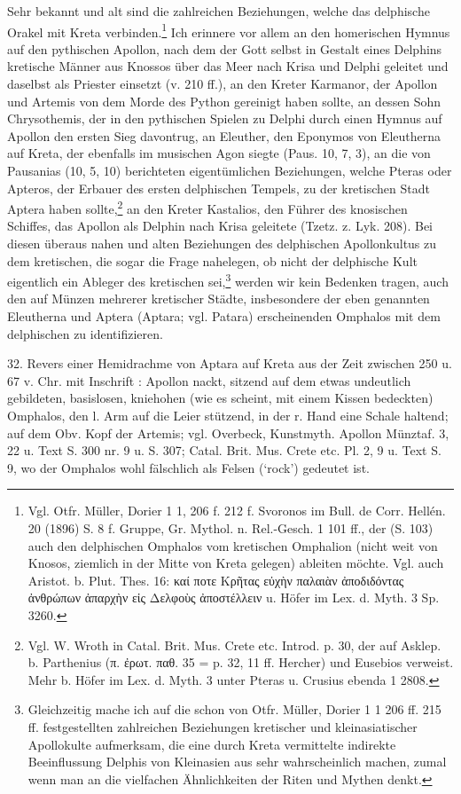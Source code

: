 \documentclass[a4paper, 11pt, oneside]{article}
\newcommand*\svgABA{}
\begin{document}
Sehr bekannt und alt sind die zahlreichen Beziehungen, welche das delphische Orakel mit Kreta verbinden.\footnote{Vgl. Otfr. Müller, Dorier 1 1, 206 f. 212 f. Svoronos im Bull. de Corr. Hellén. 20 (1896) S. 8 f. Gruppe, Gr. Mythol. n. Rel.-Gesch. 1 101 ff., der (S. 103) auch den delphischen Omphalos vom kretischen Omphalion (nicht weit von Knosos, ziemlich in der Mitte von Kreta gelegen) ableiten möchte. Vgl. auch Aristot. b. Plut. Thes. 16: καί ποτε Κρῆτας εὐχὴν παλαιὰν ἀποδιδόντας ἀνθρώπων ἀπαρχὴν εἰς Δελφοὺς ἀποστέλλειν u. Höfer im Lex. d. Myth. 3 Sp. 3260.} Ich erinnere vor allem an den homerischen Hymnus auf den pythischen Apollon, nach dem der Gott selbst in Gestalt eines Delphins kretische Männer aus Knossos über das Meer nach Krisa und Delphi geleitet und daselbst als Priester einsetzt (v. 210 ff.), an den Kreter Karmanor, der Apollon und Artemis von dem Morde des Python gereinigt haben sollte, an dessen Sohn Chrysothemis, der in den pythischen Spielen zu Delphi durch einen Hymnus auf Apollon den ersten Sieg davontrug, an Eleuther, den Eponymos von Eleutherna auf Kreta, der ebenfalls im musischen Agon siegte (Paus. 10, 7, 3), an die von Pausanias (10, 5, 10) berichteten eigentümlichen Beziehungen, welche Pteras oder Apteros, der Erbauer des ersten delphischen Tempels, zu der kretischen Stadt Aptera haben sollte,\footnote{Vgl. W. Wroth in Catal. Brit. Mus. Crete etc. Introd. p. 30, der auf Asklep. b. Parthenius (π. ἐρωτ. παθ. 35 = p. 32, 11 ff. Hercher) und Eusebios verweist. Mehr b. Höfer im Lex. d. Myth. 3 unter Pteras u. Crusius ebenda 1 2808.} an den Kreter Kastalios, den Führer des knosischen Schiffes, das Apollon als Delphin nach Krisa geleitete (Tzetz. z. Lyk. 208). Bei diesen überaus nahen und alten Beziehungen des delphischen Apollonkultus zu dem kretischen, die sogar die Frage nahelegen, ob nicht der delphische Kult eigentlich ein Ableger des kretischen sei,\footnote{Gleichzeitig mache ich auf die schon von Otfr. Müller, Dorier 1 1 206 ff. 215 ff. festgestellten zahlreichen Beziehungen kretischer und kleinasiatischer Apollokulte aufmerksam, die eine durch Kreta vermittelte indirekte Beeinflussung Delphis von Kleinasien aus sehr wahrscheinlich machen, zumal wenn man an die vielfachen Ähnlichkeiten der Riten und Mythen denkt.} werden wir kein Bedenken tragen, auch den auf Münzen mehrerer kretischer Städte, insbesondere der eben genannten Eleutherna und Aptera (Aptara; vgl. Patara) erscheinenden Omphalos mit dem delphischen zu identifizieren.

32. Revers einer Hemidrachme von Aptara auf Kreta aus der Zeit zwischen 250 u. 67 v. Chr. mit Inschrift $\svgABA$: Apollon nackt, sitzend auf dem etwas undeutlich gebildeten, basislosen, kniehohen (wie es scheint, mit einem Kissen bedeckten) Omphalos, den l. Arm auf die Leier stützend, in der r. Hand eine Schale haltend; auf dem Obv. Kopf der Artemis; vgl. Overbeck, Kunstmyth. Apollon Münztaf. 3, 22 u. Text S. 300 nr. 9 u. S. 307; Catal. Brit. Mus. Crete etc. Pl. 2, 9 u. Text S. 9, wo der Omphalos wohl fälschlich als Felsen (`rock') gedeutet ist.
\end{document}
